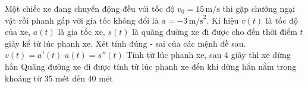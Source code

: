 \begin{ex}%
	Một chiếc xe đang chuyển động đều với tốc độ $v_0 = 15\,\mathrm{m/s}$ thì gặp chướng ngại vật rồi phanh gấp với gia tốc không đổi là $a = -3\,\mathrm{m/s}^2$. Kí hiệu $v(t)$ là tốc độ của xe, $a(t)$ là gia tốc xe, $s(t)$ là quãng đường xe đi được cho đến thời điểm $t$ giây kể từ lúc phanh  xe. Xét tính đúng - sai của các mệnh đề sau.
	\choiceTF 
		 {$v(t) = a'(t)$}
		{\True $a(t) =  s''(t)$}
		{Tính từ lúc phanh xe,  sau 4 giây thì xe dừng hẳn}
		{\True Quãng đường xe đi được tính từ lúc phanh xe đến khi dừng hẳn nằm trong khoảng từ 35  mét đến 40 mét}
\end{ex}


